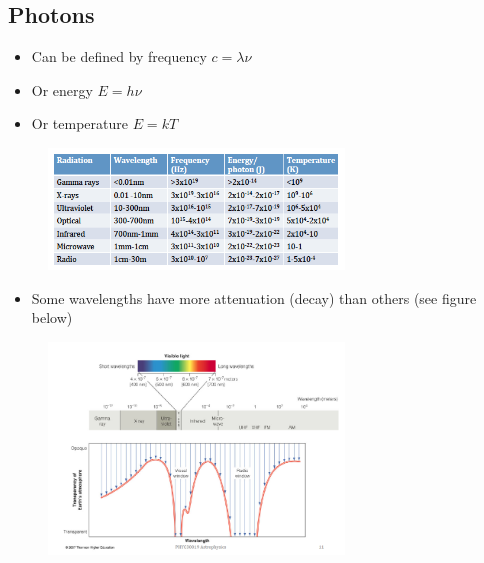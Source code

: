 \documentclass[a4paper]{article} %
\begin{document}
\subsection{Photons}
\begin{itemize}
\item Can be defined by frequency $c=\lambda\nu$
\item Or energy $E=h\nu$
\item Or temperature $E=kT$
\end{itemize}

\begin{figure}[h]
\centering
\includegraphics[width=0.7\textwidth]{images/radiation-numbers.png}
\end{figure}

\begin{itemize}
\item Some wavelengths have more attenuation (decay) than others (see figure below)
\end{itemize}

\begin{figure}[h]
\centering
\includegraphics[width=0.7\textwidth]{images/attenuation.png}
\end{figure}
\end{document}

